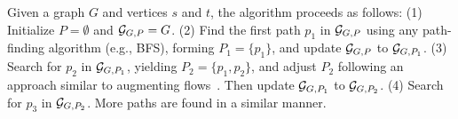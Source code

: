 Given a graph \( G \) and vertices \( s \) and \( t \), the algorithm proceeds as follows:
(1) Initialize $P = \emptyset$ and $\mathcal{G}_{G, P} = G$.
(2) Find the first path $p_1$ in $\mathcal{G}_{G, P}$ using any path-finding algorithm (e.g., BFS), forming $P_1 = \{p_1\}$, and update $\mathcal{G}_{G, P}$ to $\mathcal{G}_{G, P_1}$.
(3) Search for $p_2$ in $\mathcal{G}_{G, P_1}$, yielding $P_2 = \{p_1, p_2\}$, and adjust $P_2$ following an approach similar to augmenting flows~\cite{baseline_moreverbose}.
Then update $\mathcal{G}_{G, P_1}$ to $\mathcal{G}_{G, P_2}$.
(4) Search for $p_3$ in $\mathcal{G}_{G, P_2}$. More paths are found in a similar manner.
